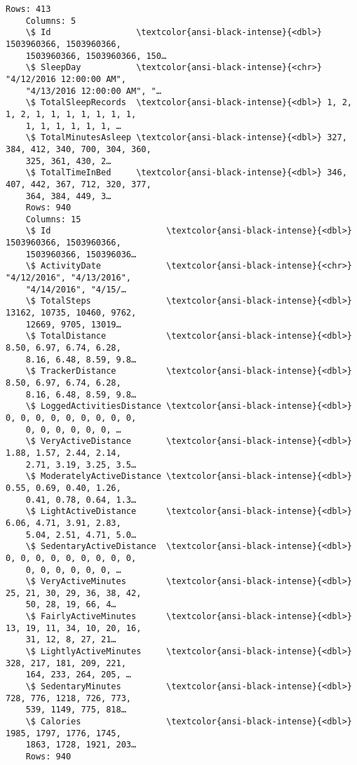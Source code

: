 \documentclass[11pt]{article}
\begin{document}
\begin{Verbatim}[commandchars=\\\{\}]
    Rows: 413
    Columns: 5
    \$ Id                 \textcolor{ansi-black-intense}{<dbl>} 1503960366, 1503960366,
    1503960366, 1503960366, 150…
    \$ SleepDay           \textcolor{ansi-black-intense}{<chr>} "4/12/2016 12:00:00 AM",
    "4/13/2016 12:00:00 AM", "…
    \$ TotalSleepRecords  \textcolor{ansi-black-intense}{<dbl>} 1, 2, 1, 2, 1, 1, 1, 1, 1, 1, 1,
    1, 1, 1, 1, 1, 1, …
    \$ TotalMinutesAsleep \textcolor{ansi-black-intense}{<dbl>} 327, 384, 412, 340, 700, 304, 360,
    325, 361, 430, 2…
    \$ TotalTimeInBed     \textcolor{ansi-black-intense}{<dbl>} 346, 407, 442, 367, 712, 320, 377,
    364, 384, 449, 3…
    Rows: 940
    Columns: 15
    \$ Id                       \textcolor{ansi-black-intense}{<dbl>} 1503960366, 1503960366,
    1503960366, 150396036…
    \$ ActivityDate             \textcolor{ansi-black-intense}{<chr>} "4/12/2016", "4/13/2016",
    "4/14/2016", "4/15/…
    \$ TotalSteps               \textcolor{ansi-black-intense}{<dbl>} 13162, 10735, 10460, 9762,
    12669, 9705, 13019…
    \$ TotalDistance            \textcolor{ansi-black-intense}{<dbl>} 8.50, 6.97, 6.74, 6.28,
    8.16, 6.48, 8.59, 9.8…
    \$ TrackerDistance          \textcolor{ansi-black-intense}{<dbl>} 8.50, 6.97, 6.74, 6.28,
    8.16, 6.48, 8.59, 9.8…
    \$ LoggedActivitiesDistance \textcolor{ansi-black-intense}{<dbl>} 0, 0, 0, 0, 0, 0, 0, 0, 0,
    0, 0, 0, 0, 0, 0, …
    \$ VeryActiveDistance       \textcolor{ansi-black-intense}{<dbl>} 1.88, 1.57, 2.44, 2.14,
    2.71, 3.19, 3.25, 3.5…
    \$ ModeratelyActiveDistance \textcolor{ansi-black-intense}{<dbl>} 0.55, 0.69, 0.40, 1.26,
    0.41, 0.78, 0.64, 1.3…
    \$ LightActiveDistance      \textcolor{ansi-black-intense}{<dbl>} 6.06, 4.71, 3.91, 2.83,
    5.04, 2.51, 4.71, 5.0…
    \$ SedentaryActiveDistance  \textcolor{ansi-black-intense}{<dbl>} 0, 0, 0, 0, 0, 0, 0, 0, 0,
    0, 0, 0, 0, 0, 0, …
    \$ VeryActiveMinutes        \textcolor{ansi-black-intense}{<dbl>} 25, 21, 30, 29, 36, 38, 42,
    50, 28, 19, 66, 4…
    \$ FairlyActiveMinutes      \textcolor{ansi-black-intense}{<dbl>} 13, 19, 11, 34, 10, 20, 16,
    31, 12, 8, 27, 21…
    \$ LightlyActiveMinutes     \textcolor{ansi-black-intense}{<dbl>} 328, 217, 181, 209, 221,
    164, 233, 264, 205, …
    \$ SedentaryMinutes         \textcolor{ansi-black-intense}{<dbl>} 728, 776, 1218, 726, 773,
    539, 1149, 775, 818…
    \$ Calories                 \textcolor{ansi-black-intense}{<dbl>} 1985, 1797, 1776, 1745,
    1863, 1728, 1921, 203…
    Rows: 940

\end{Verbatim}
\end{document}
